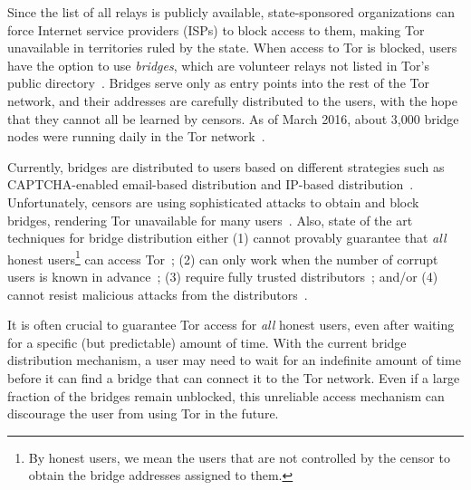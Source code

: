 \documentclass[letterpaper,twocolumn,10pt]{article}
\begin{document}

Since the list of all relays is publicly available, state-sponsored organizations can force Internet service providers (ISPs) to block access to them, making Tor unavailable in territories ruled by the state. %
When access to Tor is blocked, users have the option to use \emph{bridges}, which are volunteer relays not listed in Tor's public directory~\cite{Dingledine06designof}. Bridges serve only as entry points into the rest of the Tor network, and their addresses are carefully distributed to the users, with the hope that they cannot all be learned by censors. 
As of March 2016, about 3,000 bridge nodes were running daily in the Tor network~\cite{Tor:Bridges}.

Currently, bridges are distributed to users based on different strategies such as CAPTCHA-enabled email-based distribution and IP-based distribution~\cite{Dingledine06designof}. Unfortunately, censors are using sophisticated attacks to obtain
and block bridges, rendering Tor unavailable for many users~\cite{Dingledine:Bridges:2011,Ling:2012:infocom,BridgeBlockingChina:2012}.
Also, state of the art techniques for bridge distribution either (1) cannot provably guarantee that \emph{all} honest users\footnote{By honest users, we mean the users that are not controlled by the censor to obtain the bridge addresses assigned to them.} can access Tor~\cite{WangLBH:rBridge:13,McCoy:FC:2011,Sovran:2008:PSN}; (2) can only work when the number of corrupt users is known in advance~\cite{Mahdian:2010}; (3) require fully trusted distributors~\cite{McCoy:FC:2011,Mahdian:2010,Sovran:2008:PSN}; and/or (4) cannot resist malicious attacks from the distributors~\cite{WangLBH:rBridge:13,McCoy:FC:2011,Mahdian:2010,Sovran:2008:PSN}.

It is often crucial to guarantee Tor access for \emph{all} honest users, even after waiting for a specific (but predictable) amount of time. With the current bridge distribution mechanism, a user may need to wait for an indefinite amount of time before it can find a bridge that can connect it to the Tor network. Even if a large fraction of the bridges remain unblocked, this unreliable access mechanism can discourage the user from using Tor in the future.
\end{document}
